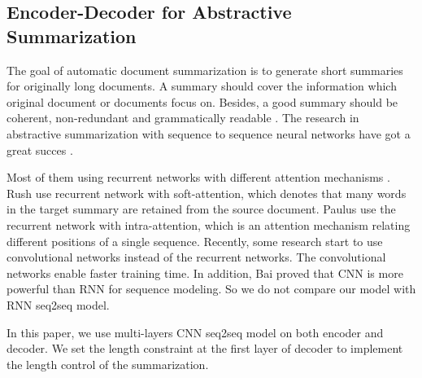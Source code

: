 \subsection{Encoder-Decoder for Abstractive Summarization}

The goal of automatic document summarization is to generate short summaries for originally
long documents. A summary should cover the information which original document or documents focus on.
Besides, a good summary should be coherent, non-redundant and grammatically readable \cite{YaoWX17}.
The research in abstractive summarization with sequence to sequence neural networks \cite{SutskeverVL14,RushCW15,ChopraAR16,NallapatiZSGX16,SeeLM17,PaulusXS17,abs-1711-05217} have got a great succes .

Most of them using recurrent networks with different attention mechanisms \cite{NallapatiZSGX16,SeeLM17,PaulusXS17}. 
Rush  use recurrent network with
soft-attention, which denotes that many words in the target summary are retained from the source document.
Paulus  use the recurrent network with intra-attention,
which is an attention mechanism relating different positions of a single sequence. Recently, some research start to
use convolutional networks instead of the recurrent networks. The convolutional networks enable faster training time.
In addition, Bai  proved that CNN is more powerful than RNN for sequence modeling.
So we do not compare our model with RNN seq2seq model. 

In this paper, we use multi-layers CNN seq2seq model on both encoder and decoder. We set the
length constraint at the first layer of decoder to implement the length control of
the summarization. 


